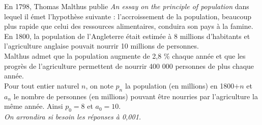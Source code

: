 \documentclass[a4paper,11pt,exos]{nsi} %
\begin{document}
\maketitle

\textcolor{UGLiBlue}{En 1798, Thomas Malthus publie \textit{An essay on the principle of population} dans lequel il émet l'hypothèse suivante : l'accroissement de la population, beaucoup plus rapide que celui des ressources alimentaires, conduira son pays à la famine.\\[.5em]
En 1800, la population de l'Angleterre était estimée à 8 millions d'habitants et l'agriculture anglaise pouvait nourrir 10 millions de personnes.\\
Malthus admet que la population augmente de 2,8 \% chaque année et que les progrès de l'agriculture permettent de nourrir 400 000 personnes de plus chaque année.\\[.5em]
Pour tout entier naturel $n$, on note $p_n$ la population (en millions) en 1800$+n$ et $a_n$ le nombre de personnes (en millions) pouvant être nourries par l'agriculture la même année. Ainsi $p_0=8$ et $a_0=10$. \\[.5em]
\textit{On arrondira si besoin les réponses à 0,001.}}
\end{document}
